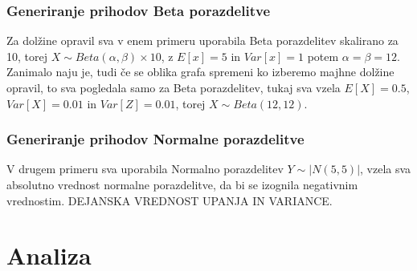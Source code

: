 \documentclass[a4paper, pt14]{article}
\begin{document}
\subsubsection{Generiranje prihodov Beta porazdelitve}
    Za dol\v zine opravil sva v enem primeru uporabila Beta porazdelitev skalirano za 10, torej $X \sim Beta(\alpha, \beta) \times 10 $, z $ E[x] = 5$ in $Var[x] = 1 $ potem $\alpha = \beta = 12$. Zanimalo naju je, tudi \v ce se oblika grafa spremeni ko izberemo majhne dol\v zine opravil, to sva pogledala samo za Beta porazdelitev, tukaj sva vzela $ E[X] = 0.5$, $Var[X] = 0.01 $ in  $Var[Z] = 0.01 $, torej $X \sim Beta(12,12)$.

\subsubsection{Generiranje prihodov Normalne porazdelitve}
  V drugem primeru sva uporabila Normalno porazdelitev $Y \sim |N(5,5)|$, vzela sva absolutno vrednost normalne porazdelitve, da bi se izognila negativnim vrednostim. DEJANSKA VREDNOST UPANJA IN VARIANCE. 



\section{Analiza}
\end{document}
